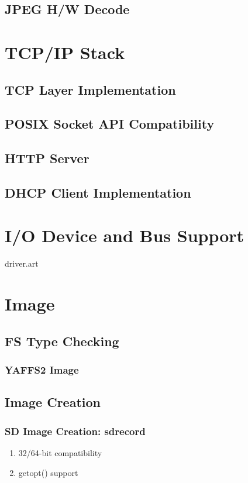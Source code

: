\documentclass[a4paper,11pt]{book}
\begin{document}
\section{JPEG H/W Decode}

\chapter{TCP/IP Stack}

\section{TCP Layer Implementation}

\section{POSIX Socket API Compatibility}

\section{HTTP Server}

\section{DHCP Client Implementation}

\chapter{I/O Device and Bus Support}
 {driver.art}

\chapter{Image}

\section{FS Type Checking}

\subsection{YAFFS2 Image}

\section{Image Creation}

\subsection{SD Image Creation: sdrecord}
\begin{enumerate}
\item 32/64-bit compatibility
\item getopt() support
\end{enumerate}
\end{document}
